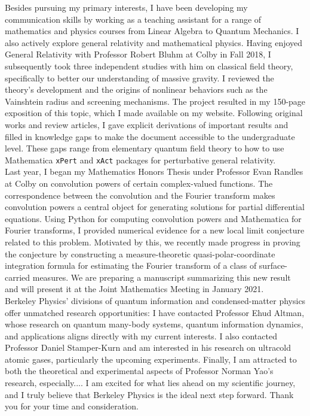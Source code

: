 \documentclass[12pt]{article}
\begin{document}
Besides pursuing my primary interests, I have been developing my communication skills by working as a teaching assistant for a range of mathematics and physics courses from Linear Algebra to Quantum Mechanics. I also actively explore general relativity and mathematical physics. Having enjoyed General Relativity with Professor Robert Bluhm at Colby in Fall 2018, I subsequently took three independent studies with him on classical field theory, specifically to better our understanding of massive gravity. I reviewed the theory's development and the origins of nonlinear behaviors such as the Vainshtein radius and screening mechanisms. The project resulted in my 150-page exposition of this topic, which I made available on my website. Following original works and review articles, I gave explicit derivations of important results and filled in knowledge gaps to make the document accessible to the undergraduate level. These gaps range from elementary quantum field theory to how to use Mathematica \texttt{xPert} and \texttt{xAct} packages for perturbative general relativity. \\ 

Last year, I began my Mathematics Honors Thesis under Professor Evan Randles at Colby on convolution powers of certain complex-valued functions. The correspondence between the convolution and the Fourier transform makes convolution powers a central object for generating solutions for partial differential equations. Using Python for computing convolution powers and Mathematica for Fourier transforms, I provided numerical evidence for a new local limit conjecture related to this problem. Motivated by this, we recently made progress in proving the conjecture by constructing a measure-theoretic quasi-polar-coordinate integration formula for estimating the Fourier transform of a class of surface-carried measures. We are preparing a manuscript summarizing this new result and will present it at the Joint Mathematics Meeting in January 2021. \\ 

Berkeley Physics' divisions of quantum information and condensed-matter physics offer unmatched research opportunities: I have contacted Professor Ehud Altman, whose research on quantum many-body systems, quantum information dynamics, and applications aligns directly with my current interests. I also contacted Professor Daniel Stamper-Kurn and am interested in his research on ultracold atomic gases, particularly the upcoming experiments. Finally, I am attracted to both the theoretical and experimental aspects of Professor Norman Yao's research, especially.... I am excited for what lies ahead on my scientific journey, and I truly believe that Berkeley Physics is the ideal next step forward. Thank you for your time and consideration.

	

















	
	
	
	
	
\end{document}
